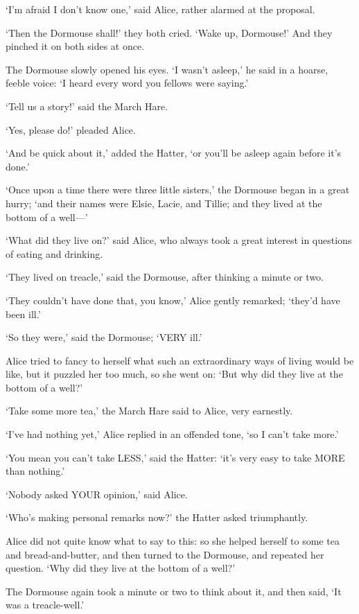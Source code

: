 \documentclass[12pt]{article}
\begin{document}
\begin{Parallel}[p]{}{}
{‘I’m afraid I don’t know one,’ said Alice, rather alarmed at the proposal.

‘Then the Dormouse shall!’ they both cried. ‘Wake up, Dormouse!’ And they pinched it on both sides at once.

The Dormouse slowly opened his eyes. ‘I wasn’t asleep,’ he said in a hoarse, feeble voice: ‘I heard every word you fellows were saying.’

‘Tell us a story!’ said the March Hare.

‘Yes, please do!’ pleaded Alice.

‘And be quick about it,’ added the Hatter, ‘or you’ll be asleep again before it’s done.’

‘Once upon a time there were three little sisters,’ the Dormouse began in a great hurry; ‘and their names were Elsie, Lacie, and Tillie; and they lived at the bottom of a well—’

‘What did they live on?’ said Alice, who always took a great interest in questions of eating and drinking.

‘They lived on treacle,’ said the Dormouse, after thinking a minute or two.

‘They couldn’t have done that, you know,’ Alice gently remarked; ‘they’d have been ill.’

‘So they were,’ said the Dormouse; ‘VERY ill.’

Alice tried to fancy to herself what such an extraordinary ways of living would be like, but it puzzled her too much, so she went on: ‘But why did they live at the bottom of a well?’

‘Take some more tea,’ the March Hare said to Alice, very earnestly.

‘I’ve had nothing yet,’ Alice replied in an offended tone, ‘so I can’t take more.’

‘You mean you can’t take LESS,’ said the Hatter: ‘it’s very easy to take MORE than nothing.’

‘Nobody asked YOUR opinion,’ said Alice.

‘Who’s making personal remarks now?’ the Hatter asked triumphantly.

Alice did not quite know what to say to this: so she helped herself to some tea and bread-and-butter, and then turned to the Dormouse, and repeated her question. ‘Why did they live at the bottom of a well?’

The Dormouse again took a minute or two to think about it, and then said, ‘It was a treacle-well.’

}
\end{Parallel}
\end{document}

